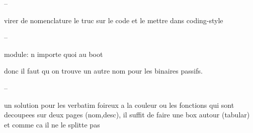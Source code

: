 %
%






--

virer de nomenclature le truc sur le code et le mettre dans coding-style

--

module: n importe quoi au boot

donc il faut qu on trouve un autre nom pour les binaires passifs.

--

un solution pour les verbatim foireux a la couleur ou les fonctions
qui sont decoupees sur deux pages (nom,desc), il suffit de faire une
box autour (tabular) et comme ca il ne le splitte pas
